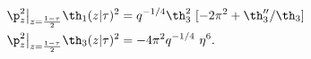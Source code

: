 \begin{equation}
  \begin{split}
     \p_z^2\big|_{z={1-\tau\over 2}} \th_1(z|\tau)^2 
       &=  q^{-1/4} \th_3^2 ~[ -2 \pi^2 + \th_3'' / \th_3 ] \\
     \p_z^2\big|_{z={1-\tau\over 2}} \th_3(z|\tau)^2 
       &=  -4 \pi^2  q^{-1/4} ~\eta^6.
  \end{split}
\end{equation}

